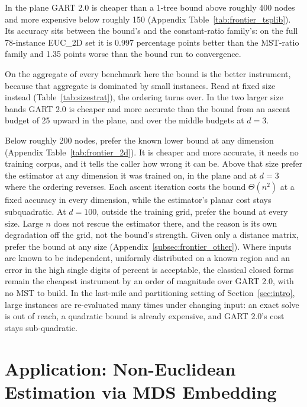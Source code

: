\documentclass{article}
\begin{document}
In the plane GART 2.0 is cheaper than a 1-tree bound above roughly 400 nodes and more expensive below roughly 150 (Appendix Table~\ref{tab:frontier_tsplib}). Its accuracy sits between the bound's and the constant-ratio family's: on the full 78-instance EUC\_2D set it is 0.997 percentage points better than the MST-ratio family and 1.35 points worse than the bound run to convergence.

On the aggregate of every benchmark here the bound is the better instrument, because that aggregate is dominated by small instances. Read at fixed size instead (Table~\ref{tab:sizestrat}), the ordering turns over. In the two larger size bands GART 2.0 is cheaper and more accurate than the bound from an ascent budget of 25 upward in the plane, and over the middle budgets at $d=3$.

Below roughly 200 nodes, prefer the known lower bound at any dimension (Appendix Table~\ref{tab:frontier_2d}). It is cheaper and more accurate, it needs no training corpus, and it tells the caller how wrong it can be. Above that size prefer the estimator at any dimension it was trained on, in the plane and at $d=3$ where the ordering reverses. Each ascent iteration costs the bound $\Theta(n^{2})$ at a fixed accuracy in every dimension, while the estimator's planar cost stays subquadratic. At $d=100$, outside the training grid, prefer the bound at every size. Large $n$ does not rescue the estimator there, and the reason is its own degradation off the grid, not the bound's strength. Given only a distance matrix, prefer the bound at any size (Appendix~\ref{subsec:frontier_other}). Where inputs are known to be independent, uniformly distributed on a known region and an error in the high single digits of percent is acceptable, the classical closed forms remain the cheapest instrument by an order of magnitude over GART 2.0, with no MST to build. In the last-mile and partitioning setting of Section~\ref{sec:intro}, large instances are re-evaluated many times under changing input: an exact solve is out of reach, a quadratic bound is already expensive, and GART 2.0's cost stays sub-quadratic. 

\section{Application: Non-Euclidean Estimation via MDS Embedding} \label{sec:application}
\end{document}
